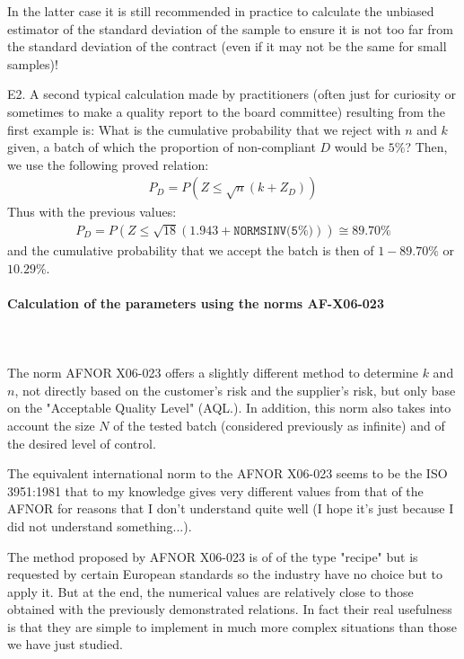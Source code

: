 	\begin{tcolorbox}[colframe=black,colback=white,sharp corners]
	\begin{tcolorbox}[title=Remark,colframe=black,arc=10pt]
	In the latter case it is still recommended in practice to calculate the unbiased estimator of the standard deviation of the sample to ensure it is not too far from the standard deviation of the contract (even if it may not be the same for small samples)!
	\end{tcolorbox}	
	E2. A second typical calculation made by practitioners (often just for curiosity or sometimes to make a quality report to the board committee) resulting from the first example is: What is the cumulative probability that we reject with $n$ and $k$ given, a batch of which the proportion of non-compliant $D$ would be $5\%$? Then, we use the following proved relation:
	\begin{gather*}
		P_D=P(Z\leq \sqrt{n}(k+Z_D))
	\end{gather*}
	Thus with the previous values:
	\begin{gather*}
		P_D=P(Z\leq \sqrt{18}(1.943+\texttt{NORMSINV(5\%)}))\cong 89.70\%
	\end{gather*}
	and the cumulative probability that we accept the batch is then of $1-89.70\%$ or $10.29\%$.
	\end{tcolorbox}
	
	\paragraph{Calculation of the parameters using the norms AF-X06-023}\mbox{}\\\\
	The norm AFNOR X06-023 offers a slightly different method to determine $k$ and $n$, not directly based on the customer's risk and the supplier's risk, but only base on the "Acceptable Quality Level" (AQL.). In addition, this norm also takes into account the size $N$ of the tested batch (considered previously as infinite) and of the desired level of control.
	\begin{tcolorbox}[title=Remark,colframe=black,arc=10pt]
	The equivalent international norm to the  AFNOR X06-023 seems to be the ISO 3951:1981 that to my knowledge gives very different values from that of the AFNOR for reasons that I don't understand quite well (I hope it's just because I did not understand something...).
	\end{tcolorbox}	
	The method proposed by AFNOR X06-023 is of of the type "recipe" but is requested by certain European standards so the industry have no choice but to apply it. But at the end, the numerical values are relatively close to those obtained with the previously demonstrated relations. In fact their real usefulness is that they are simple to implement in much more complex situations than those we have just studied.

